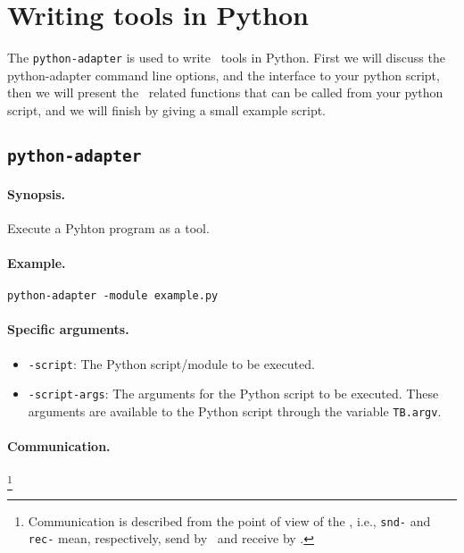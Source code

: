 
\section{\label{ToolInPython}Writing tools in Python}

The {\tt python-adapter} is used to write \TB\ tools in Python.
First we will discuss the python-adapter command line options, and
the interface to your python script,
then we will present the \TB\ related functions that can be called
from your python script, and we will finish by giving a small example
script.

\subsection{\label{python-adapter}{\tt python-adapter}}

\paragraph{Synopsis.} Execute a Pyhton program as a tool.

\paragraph{Example.} {\tt python-adapter -module example.py}

\paragraph{Specific arguments.}
\begin{itemize}
\item {\tt -script}: The Python script/module to be executed.
\item {\tt -script-args}: The arguments for the Python script to be executed.
	These arguments are available to the Python script through the
        variable {\tt TB.argv}.
\end{itemize}

\paragraph{Communication.} \hspace{-0.3cm}\footnote{Communication is described
from the point of view of the \TB, i.e., {\tt snd-} and {\tt rec-}
mean, respectively, send by \TB\ and receive by \TB.}

